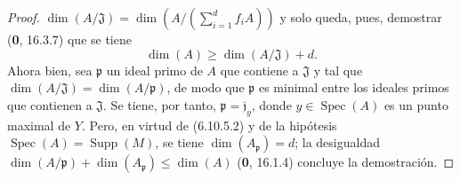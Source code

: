 \begin{proof}
$\dim(A/\mathfrak J)=\dim(A/(\sum_{i=1}^{d}f_iA))$
y solo queda, pues, demostrar (\textbf 0, 16.3.7) que se tiene
\[
\dim(A)\geq\dim(A/\mathfrak J)+d.
\]
Ahora bien, sea $\mathfrak p$ un ideal primo de $A$ que contiene a $\mathfrak J$ y
tal que $\dim(A/\mathfrak J)=\dim(A/\mathfrak p)$, de modo que
$\mathfrak p$ es minimal entre los ideales primos que contienen a
$\mathfrak J$. Se tiene, por tanto, $\mathfrak p=\mathfrak j_y$, donde
$y\in\operatorname{Spec}(A)$ es un punto maximal de $Y$. Pero, en virtud de
(6.10.5.2) y de la hipótesis
$\operatorname{Spec}(A)=\operatorname{Supp}(M)$, se tiene
$\dim(A_{\mathfrak p})=d$; la desigualdad
$\dim(A/\mathfrak p)+\dim(A_{\mathfrak p})\leq\dim(A)$ (\textbf 0, 16.1.4)
concluye la demostración.
\end{proof}
